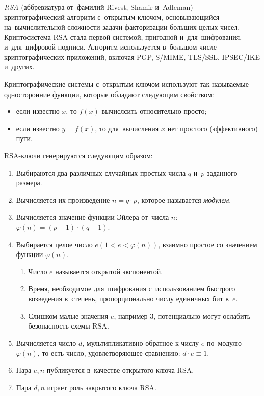 \subsubsection{}
\label{sec:analysis:research:crypto:rsa}

\emph{RSA} (аббревиатура от~фамилий Rivest, Shamir и~Adleman) — криптографический алгоритм с~открытым ключом, основывающийся на~вычислительной сложности задачи факторизации больших целых чисел. Криптосистема RSA стала первой системой, пригодной и~для~шифрования, и~для~цифровой подписи. Алгоритм используется в~большом числе криптографических приложений, включая PGP, S/MIME, TLS/SSL, IPSEC/IKE и~других\cite{wiki:rsa}.

Криптографические системы с~открытым ключом используют так называемые односторонние функции, которые обладают следующим свойством:
\begin{itemize}
	\item если известно \(x\), то \(f(x)\) вычислсить относительно просто;
	\item если известно \(y=f(x)\), то для~вычисления \(x\) нет простого (эффективного) пути.
\end{itemize}

RSA-ключи генерируются следующим образом:
\begin{enumerate}
	\item Выбираются два различных случайных простых числа \(q\) и~\(p\) заданного размера.
	\item Вычисляется их произведение \(n=q \cdot p\), которое называется \emph{модулем}.
	\item Вычисляется значение функции Эйлера от~числа \(n\): \(\varphi(n)=(p-1) \cdot (q-1)\).
	\item Выбирается целое число \(e (1 < e < \varphi(n))\), взаимно простое со значением функции \(\varphi(n)\).
	\begin{enumerate}
		\item Число \(e\) называется открытой экспонентой.
		\item Время, необходимое для~шифрования с~использованием быстрого возведения в~степень, пропорционально числу единичных бит в~\(e\).
		\item Слишком малые значения \(e\), например 3, потенциально могут ослабить безопасность схемы RSA.
	\end{enumerate}
	\item Вычисляется число \(d\), мультипликативно обратное к числу \(e\) по~модулю  \(\varphi(n)\), то есть число, удовлетворяющее сравнению: \(d \cdot e \equiv 1\).
	\item Пара \({e,n}\) публикуется в~качестве открытого ключа RSA.
	\item Пара \({d,n}\)  играет роль закрытого ключа RSA.
\end{enumerate}

